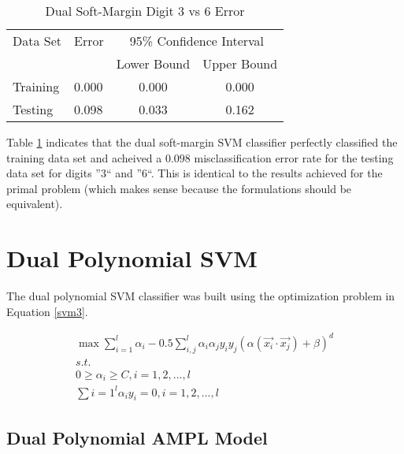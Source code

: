 \documentclass{article}
\begin{document}
\begin{table}\label{table2}
\caption{Dual Soft-Margin Digit 3 vs 6 Error}
\begin{center}
\begin{tabular}{llcc}
\toprule
Data Set & Error & \multicolumn{2}{c}{95\% Confidence Interval} \\
\cmidrule(r){3-4}
& & Lower Bound & Upper Bound \\
\midrule
Training & 0.000 & 0.000 & 0.000 \\
Testing & 0.098 & 0.033 & 0.162 \\
\bottomrule
\end{tabular}
\end{center}
\end{table}

Table \ref{table2} indicates that the dual soft-margin SVM classifier perfectly classified the training data set and acheived a \(0.098\) misclassification error rate for the testing data set for digits ''3`` and ''6``. This is identical to the results achieved for the primal problem (which makes sense because the formulations should be equivalent).

\section{Dual Polynomial SVM}\label{model3}

The dual polynomial SVM classifier was built using the optimization problem in Equation \ref{svm3}.

\begin{equation}\label{svm3}
\begin{split}
\max \sum_{i=1}^l \alpha_i - 0.5 \sum_{i,j}^l \alpha_i \alpha_j y_i y_j \left( \alpha \left( \vec{x_i} \cdot \vec{x_j} \right) + \beta \right)^d \\
s.t. \\
0 \ge \alpha_i \ge C , i = 1,2,...,l \\
\sum{i=1}^l \alpha_i y_i = 0 , i = 1,2,...,l
\end{split}
\end{equation}

\subsection{Dual Polynomial AMPL Model}
\end{document}
